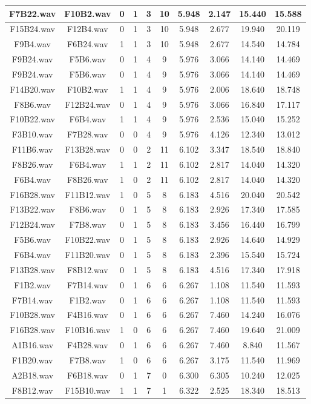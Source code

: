 \documentclass[11pt,a4paper,twoside]{book}
\begin{document}
\begin{longtable}[c]{|c|c|c|c|c|c|c|c|c|c|}
F7B22.wav&F10B2.wav&0&1&3&10&5.948&2.147&15.440&15.588\\ \hline
F15B24.wav&F12B4.wav&0&1&3&10&5.948&2.677&19.940&20.119\\ \hline
F9B4.wav&F6B24.wav&1&1&3&10&5.948&2.677&14.540&14.784\\ \hline
F9B24.wav&F5B6.wav&0&1&4&9&5.976&3.066&14.140&14.469\\ \hline
F9B24.wav&F5B6.wav&0&1&4&9&5.976&3.066&14.140&14.469\\ \hline
F14B20.wav&F10B2.wav&1&1&4&9&5.976&2.006&18.640&18.748\\ \hline
F8B6.wav&F12B24.wav&0&1&4&9&5.976&3.066&16.840&17.117\\ \hline
F10B22.wav&F6B4.wav&1&1&4&9&5.976&2.536&15.040&15.252\\ \hline
F3B10.wav&F7B28.wav&0&0&4&9&5.976&4.126&12.340&13.012\\ \hline
F11B6.wav&F13B28.wav&0&0&2&11&6.102&3.347&18.540&18.840\\ \hline
F8B26.wav&F6B4.wav&1&1&2&11&6.102&2.817&14.040&14.320\\ \hline
F6B4.wav&F8B26.wav&1&0&2&11&6.102&2.817&14.040&14.320\\ \hline
F16B28.wav&F11B12.wav&1&0&5&8&6.183&4.516&20.040&20.542\\ \hline
F13B22.wav&F8B6.wav&0&1&5&8&6.183&2.926&17.340&17.585\\ \hline
F12B24.wav&F7B8.wav&0&1&5&8&6.183&3.456&16.440&16.799\\ \hline
F5B6.wav&F10B22.wav&0&1&5&8&6.183&2.926&14.640&14.929\\ \hline
F6B4.wav&F11B20.wav&0&1&5&8&6.183&2.396&15.540&15.724\\ \hline
F13B28.wav&F8B12.wav&0&1&5&8&6.183&4.516&17.340&17.918\\ \hline
F1B2.wav&F7B14.wav&0&1&6&6&6.267&1.108&11.540&11.593\\ \hline
F7B14.wav&F1B2.wav&0&1&6&6&6.267&1.108&11.540&11.593\\ \hline
F10B28.wav&F4B16.wav&0&1&6&6&6.267&7.460&14.240&16.076\\ \hline
F16B28.wav&F10B16.wav&1&0&6&6&6.267&7.460&19.640&21.009\\ \hline
A1B16.wav&F4B28.wav&0&1&6&6&6.267&7.460&8.840&11.567\\ \hline
F1B20.wav&F7B8.wav&1&0&6&6&6.267&3.175&11.540&11.969\\ \hline
A2B18.wav&F6B18.wav&0&1&7&0&6.300&6.305&10.240&12.025\\ \hline
F8B12.wav&F15B10.wav&1&1&7&1&6.322&2.525&18.340&18.513\\ \hline

\end{longtable}
\end{document}
